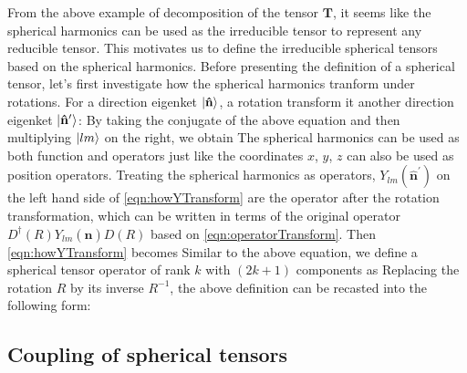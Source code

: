 From  the above example of decomposition of the tensor $\mathbf{T}$, it seems like the spherical harmonics can be 
used as the irreducible tensor to represent any reducible tensor. This motivates us to define the irreducible spherical
tensors based on the spherical harmonics. Before presenting the definition of a spherical tensor, let's first investigate
how the spherical harmonics tranform under rotations. For a direction eigenket $|   \mathbf{\hat{n}}   \rangle$, a rotation 
transform it another direction eigenket $|   \mathbf{\hat{n }^{\prime} }   \rangle$:
By taking the conjugate of the above equation and then multiplying $| l m \rangle$ on the right, we obtain
The spherical harmonics can be used as both function and operators just like the coordinates $x$, $y$, $z$ can also 
be used as position operators. Treating the spherical harmonics as operators, $Y_{lm}(\mathbf{\hat{n}^{\prime} })$ on
 the left hand side of \autoref{eqn:howYTransform} are the operator after the rotation transformation, which can be written in terms of  
the original operator $D^{\dagger}(R) Y_{lm}(\mathbf{\hat{n} }) D(R)$ based on \autoref{eqn:operatorTransform}. 
Then \autoref{eqn:howYTransform} becomes
Similar to the above equation, we define a spherical tensor operator of rank $k$ with $(2 k + 1)$ components as
Replacing the rotation $R$ by its inverse $R^{-1}$, the above definition can be recasted into the following form:

\subsection{Coupling of spherical tensors}

